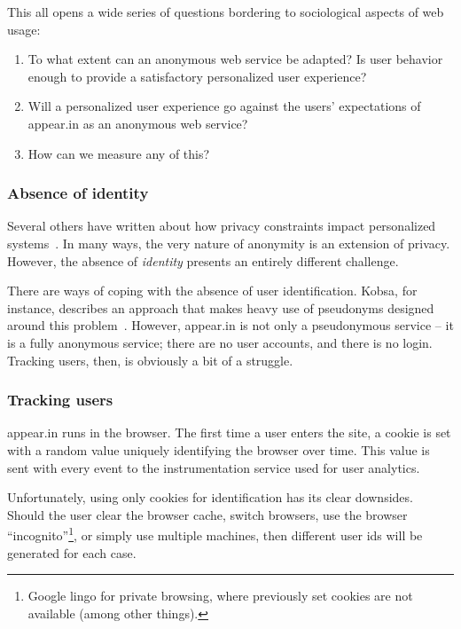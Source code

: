 This all opens a wide series of questions bordering to sociological aspects of web usage:

\begin{enumerate}
  \item
    To what extent can an anonymous web service be adapted?
    Is user behavior enough to provide a satisfactory personalized user experience?
  \item
    Will a personalized user experience go against the users' expectations of appear.in as an anonymous web service?
  \item
    How can we measure any of this?
\end{enumerate}

\subsubsection{Absence of identity} %

Several others have written about how privacy constraints impact personalized systems~\cite{Teltzrow2004,Kobsa2007}. In many ways, the very nature of anonymity is an extension of privacy. However, the absence of \emph{identity} presents an entirely different challenge.

There are ways of coping with the absence of user identification. Kobsa, for instance, describes an approach that makes heavy use of pseudonyms designed around this problem~\cite{Kobsa2003}.
However, appear.in is not only a pseudonymous service -- it is a fully anonymous service; there are no user accounts, and there is no login.
Tracking users, then, is obviously a bit of a struggle.

\subsubsection{Tracking users}

appear.in runs in the browser. The first time a user enters the site, a cookie is set with a random value uniquely identifying the browser over time. This value is sent with every event to the instrumentation service used for user analytics.

Unfortunately, using only cookies for identification has its clear downsides. Should the user clear the browser cache, switch browsers, use the browser ``incognito''\footnote{Google lingo for private browsing, where previously set cookies are not available (among other things).}, or simply use multiple machines, then different user ids will be generated for each case.

